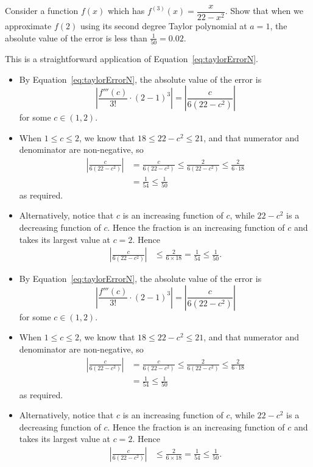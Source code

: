\begin{question}[2015Q]
Consider a function $f(x)$ which has $f^{(3)}(x)=\dfrac{x}{22-x^2}$.  Show
that when we approximate $f(2)$ using its second degree Taylor polynomial at $a=1$, the
absolute value of the error is less than $\frac{1}{50}=0.02$.
\end{question}
\begin{hint}
This is a straightforward application of Equation~\ref*{eq:taylorErrorN}.
\end{hint}
\begin{answer}
\begin{itemize}
 \item By  Equation~\ref*{eq:taylorErrorN}, the absolute value of the error is
\[\left|\frac{f'''(c)}{3!}\cdot (2-1)^3\right|
= \left|\frac{c}{6(22-c^2)}\right|\]
for some $c \in (1,2)$.
\item When $1\leq c\leq2$, we know that $18 \leq 22-c^2 \leq 21$, and that numerator and denominator are non-negative, so
\begin{align*}
\left|\frac{c}{6(22-c^2)}\right|
  &=\frac{c}{6(22-c^2)}
  \leq \frac{2}{6(22-c^2)}  \leq \frac{2}{6\cdot 18} \\
  & = \frac{1}{54} \leq \frac{1}{50}
\end{align*}
as required.

\item Alternatively, notice that $c$ is an increasing function of
$c$, while $22-c^2$ is a decreasing function of $c$. Hence the fraction is an
increasing function of $c$ and takes its largest value at $c=2$. Hence
\begin{align*}
\left|\frac{c}{6(22-c^2)}\right|
& \leq \frac{2}{6\times 18} = \frac{1}{54} \leq \frac{1}{50}.
\end{align*}
\end{itemize}
\end{answer}
\begin{solution}
\begin{itemize}
 \item By  Equation~\ref*{eq:taylorErrorN}, the absolute value of the error is
\[\left|\frac{f'''(c)}{3!}\cdot (2-1)^3\right|
= \left|\frac{c}{6(22-c^2)}\right|\]
for some $c \in (1,2)$.
\item When $1\leq c\leq2$, we know that $18 \leq 22-c^2 \leq 21$, and that numerator and denominator are non-negative, so
\begin{align*}
\left|\frac{c}{6(22-c^2)}\right|
  &=\frac{c}{6(22-c^2)}
  \leq \frac{2}{6(22-c^2)}  \leq \frac{2}{6\cdot 18} \\
  & = \frac{1}{54} \leq \frac{1}{50}
\end{align*}
as required.

\item Alternatively, notice that $c$ is an increasing function of
$c$, while $22-c^2$ is a decreasing function of $c$. Hence the fraction is an
increasing function of $c$ and takes its largest value at $c=2$. Hence
\begin{align*}
\left|\frac{c}{6(22-c^2)}\right|
& \leq \frac{2}{6\times 18} = \frac{1}{54} \leq \frac{1}{50}.
\end{align*}
\end{itemize}
\end{solution}
